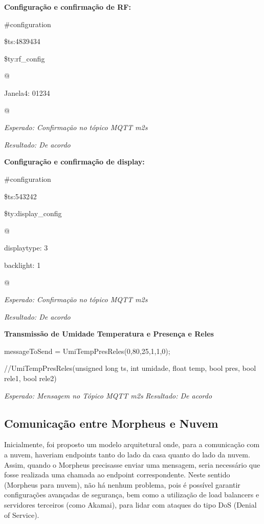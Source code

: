 \textbf{Configuração e confirmação de RF:}

\#configuration

\$ts:4839434

\$ty:rf\_config

@

Janela4: 01234

@

\textit{Esperado: Confirmação no tópico MQTT m2s}

\textit{Resultado: De acordo}

\textbf{Configuração e confirmação de display:}

\#configuration

\$ts:543242

\$ty:display\_config

@

displaytype: 3

backlight: 1

@

\textit{Esperado: Confirmação no tópico MQTT m2s}

\textit{Resultado: De acordo}

\textbf{Transmissão de Umidade Temperatura e Presença e Reles}

messageToSend = UmiTempPresReles(0,80,25,1,1,0);

//UmiTempPresReles(unsigned long ts, int umidade, float temp, bool pres, bool rele1, bool rele2)

\textit{Esperado: Mensagem no Tópico MQTT m2s}
\textit{Resultado: De acordo}


\subsection{Comunicação entre Morpheus e Nuvem}

Inicialmente, foi proposto um modelo arquitetural onde, para a comunicação com a nuvem, haveriam endpoints tanto do lado da casa quanto do lado da nuvem. Assim, quando o Morpheus precisasse enviar uma mensagem, seria necessário que fosse realizada uma chamada ao endpoint correspondente. Neste sentido (Morpheus para nuvem), não há nenhum problema, pois é possível garantir configurações avançadas de segurança, bem como a utilização de load balancers e servidores terceiros (como Akamai), para lidar com ataques do tipo DoS (Denial of Service).


